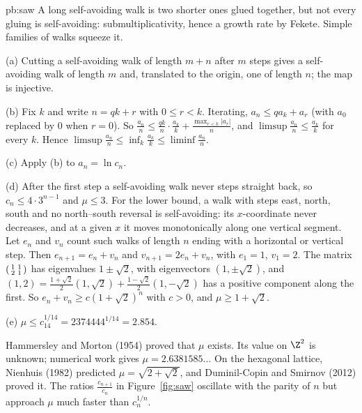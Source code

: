 \begin{solution}{pb:saw}
\idea A long self-avoiding walk is two shorter ones glued together, but not every gluing is self-avoiding: submultiplicativity, hence a growth rate by Fekete. Simple
families of walks squeeze it.

\writeup (a) Cutting a self-avoiding walk of length $m+n$ after $m$ steps gives a self-avoiding walk of length $m$ and, translated to the origin, one of length $n$; the map is injective.

(b) Fix $k$ and write $n=qk+r$ with $0\le r<k$. Iterating, $a_n\le qa_k+a_r$ (with $a_0$ replaced by $0$ when $r=0$). So $\frac{a_n}n\le\frac{qk}n\cdot\frac{a_k}k+\frac{\max_{r<k}|a_r|}n$, and $\limsup\frac{a_n}n\le\frac{a_k}k$ for every
$k$. Hence $\limsup\frac{a_n}n\le\inf_k\frac{a_k}k\le\liminf\frac{a_n}n$.

(c) Apply (b) to $a_n=\ln c_n$.

(d) After the first step a self-avoiding walk never steps straight back, so $c_n\le4\cdot3^{n-1}$ and $\mu\le3$. For the lower bound, a walk with steps east, north, south and no north--south
reversal is self-avoiding: its $x$-coordinate never decreases, and at a given $x$ it moves monotonically along one vertical segment. Let $e_n$ and $v_n$ count such walks of length
$n$ ending with a horizontal or vertical step. Then $e_{n+1}=e_n+v_n$ and $v_{n+1}=2e_n+v_n$, with $e_1=1$, $v_1=2$. The matrix $\begin{psmallmatrix}1&1\\2&1\end{psmallmatrix}$ has eigenvalues $1\pm\sqrt2$, with eigenvectors $(1,\pm\sqrt2)$, and
$(1,2)=\frac{1+\sqrt2}2(1,\sqrt2)+\frac{1-\sqrt2}2(1,-\sqrt2)$ has a positive component along the first. So $e_n+v_n\ge c(1+\sqrt2)^n$
with $c>0$, and $\mu\ge1+\sqrt2$.

(e) $\mu\le c_{14}^{1/14}=2374444^{1/14}=2.854$.

\leads Hammersley and Morton (1954) proved that $\mu$ exists. Its value on $\Z^2$ is unknown; numerical work gives $\mu=2.6381585\ldots$ On the hexagonal lattice, Nienhuis (1982) predicted
$\mu=\sqrt{2+\sqrt2}$, and Duminil-Copin and Smirnov (2012) proved it. The ratios $\frac{c_{n+1}}{c_n}$ in Figure~\ref{fig:saw} oscillate with the parity of $n$ but approach $\mu$ much faster than $c_n^{1/n}$.
\end{solution}

